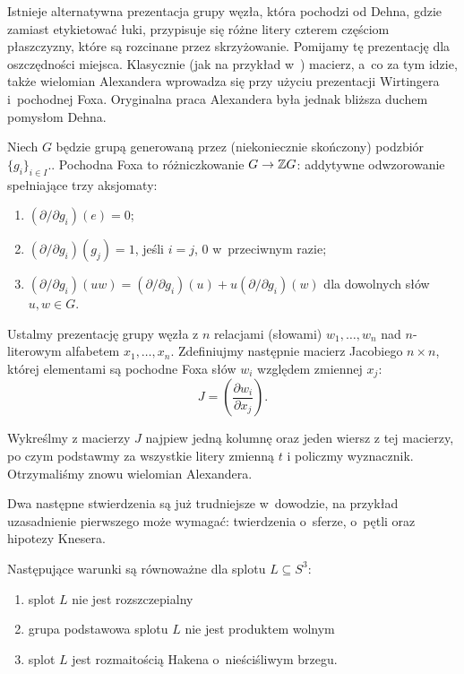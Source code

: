 Istnieje alternatywna prezentacja grupy węzła, która pochodzi od Dehna, gdzie zamiast etykietować łuki, przypisuje się różne litery czterem częściom płaszczyzny, które są rozcinane przez skrzyżowanie.
Pomijamy tę prezentację dla oszczędności miejsca.
Klasycznie (jak na przykład w~\cite{crowell63}) macierz, a~co za tym idzie, także wielomian Alexandera wprowadza się przy użyciu prezentacji Wirtingera i~pochodnej Foxa.
Oryginalna praca Alexandera była jednak bliższa duchem pomysłom Dehna.

\begin{definition}
    Niech $G$ będzie grupą generowaną przez (niekoniecznie skończony) podzbiór $\{g_i\}_{i \in I}$..
    Pochodna Foxa to różniczkowanie $G \to \mathbb Z G$: addytywne odwzorowanie spełniające trzy aksjomaty:
    \begin{enumerate}
        \item $(\partial/\partial g_i)(e) = 0$;
        \item $(\partial/\partial g_i)(g_j) = 1$, jeśli $i = j$, $0$ w~przeciwnym razie;
        \item $(\partial/\partial g_i)(uw) = (\partial/\partial g_i)(u) + u(\partial/\partial g_i)(w)$ dla dowolnych słów $u, w \in G$.
    \end{enumerate}
\end{definition}

Ustalmy prezentację grupy węzła z $n$ relacjami (słowami) $w_1, \ldots, w_n$ nad $n$-literowym alfabetem $x_1, \ldots, x_n$.
Zdefiniujmy następnie macierz Jacobiego $n \times n$, której elementami są pochodne Foxa słów $w_i$ względem zmiennej $x_j$:
\begin{equation}
    J = \left(\frac{\partial w_i}{\partial x_j}\right).
\end{equation}

Wykreślmy z macierzy $J$ najpiew jedną kolumnę oraz jeden wiersz z tej macierzy, po czym podstawmy za wszystkie litery zmienną $t$ i policzmy wyznacznik.
Otrzymaliśmy znowu wielomian Alexandera.

Dwa następne stwierdzenia są już trudniejsze w~dowodzie,
na przykład uzasadnienie pierwszego może wymagać:
twierdzenia o~sferze, o~pętli oraz hipotezy Knesera.

\begin{proposition}
    \label{prop:knot_group_split}
    Następujące warunki są równoważne dla splotu $L \subseteq S^3$:
    \begin{enumerate}
        \item splot $L$ nie jest rozszczepialny
        \item grupa podstawowa splotu $L$ nie jest produktem wolnym
        \item splot $L$ jest rozmaitością Hakena o~nieściśliwym brzegu.
    \end{enumerate}
\end{proposition}

